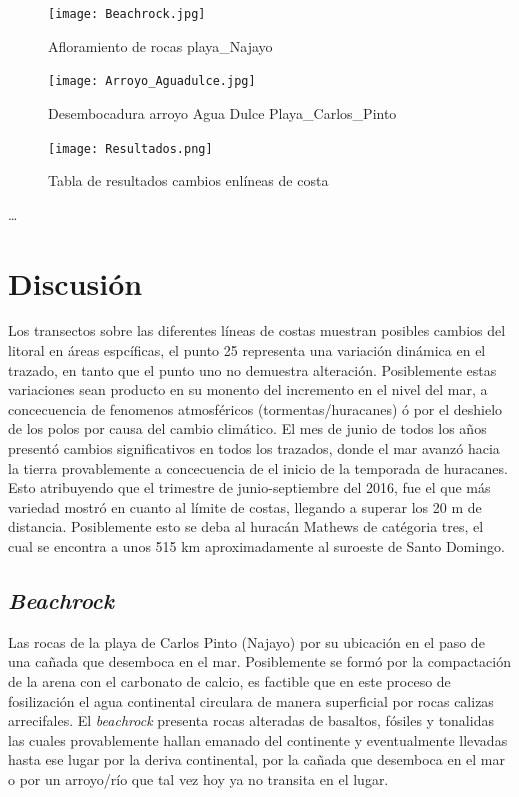 \documentclass[11pt,]{article}
\begin{document}
\begin{figure}
\centering
\texttt{[image: Beachrock.jpg]}
\caption{Afloramiento de rocas playa\_Najayo\label{beachrock}}
\end{figure}

\begin{figure}
\centering
\texttt{[image: Arroyo\_Aguadulce.jpg]}
\caption{Desembocadura arroyo Agua Dulce
Playa\_Carlos\_Pinto\label{arroyo_aguadulce}}
\end{figure}

\begin{figure}
\centering
\texttt{[image: Resultados.png]}
\caption{Tabla de resultados cambios enlíneas de
costa\label{resultados}}
\end{figure}

\ldots

\section{Discusión}\label{discusiuxf3n}

Los transectos sobre las diferentes líneas de costas muestran posibles
cambios del litoral en áreas espcíficas, el punto 25 representa una
variación dinámica en el trazado, en tanto que el punto uno no demuestra
alteración. Posiblemente estas variaciones sean producto en su monento
del incremento en el nivel del mar, a concecuencia de fenomenos
atmosféricos (tormentas/huracanes) ó por el deshielo de los polos por
causa del cambio climático. El mes de junio de todos los años presentó
cambios significativos en todos los trazados, donde el mar avanzó hacia
la tierra provablemente a concecuencia de el inicio de la temporada de
huracanes. Esto atribuyendo que el trimestre de junio-septiembre del
2016, fue el que más variedad mostró en cuanto al límite de costas,
llegando a superar los 20 m de distancia. Posiblemente esto se deba al
huracán Mathews de catégoria tres, el cual se encontra a unos 515 km
aproximadamente al suroeste de Santo Domingo.

\subsection{\texorpdfstring{\emph{Beachrock}}{Beachrock}}\label{beachrock}

Las rocas de la playa de Carlos Pinto (Najayo) por su ubicación en el
paso de una cañada que desemboca en el mar. Posiblemente se formó por la
compactación de la arena con el carbonato de calcio, es factible que en
este proceso de fosilización el agua continental circulara de manera
superficial por rocas calizas arrecifales. El \emph{beachrock} presenta
rocas alteradas de basaltos, fósiles y tonalidas las cuales
provablemente hallan emanado del continente y eventualmente llevadas
hasta ese lugar por la deriva continental, por la cañada que desemboca
en el mar o por un arroyo/río que tal vez hoy ya no transita en el
lugar.
\end{document}
